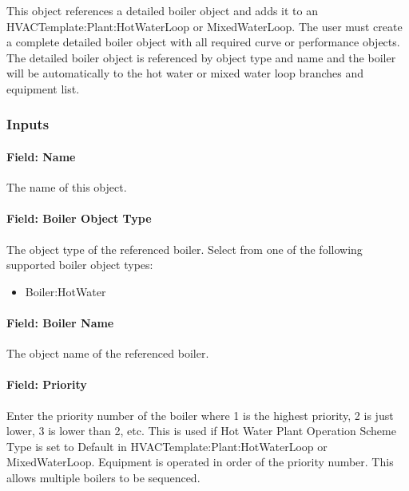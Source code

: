 This object references a detailed boiler object and adds it to an HVACTemplate:Plant:HotWaterLoop or MixedWaterLoop. The user must create a complete detailed boiler object with all required curve or performance objects. The detailed boiler object is referenced by object type and name and the boiler will be automatically to the hot water or mixed water loop branches and equipment list.

\subsubsection{Inputs}\label{inputs-30-000}

\paragraph{Field: Name}\label{field-name-17-002}

The name of this object.

\paragraph{Field: Boiler Object Type}\label{field-boiler-object-type}

The object type of the referenced boiler. Select from one of the following supported boiler object types:

\begin{itemize}
\tightlist
\item
  Boiler:HotWater
\end{itemize}

\paragraph{Field: Boiler Name}\label{field-boiler-name}

The object name of the referenced boiler.

\paragraph{Field: Priority}\label{field-priority-5}

Enter the priority number of the boiler where 1 is the highest priority, 2 is just lower, 3 is lower than 2, etc. This is used if Hot Water Plant Operation Scheme Type is set to Default in HVACTemplate:Plant:HotWaterLoop or MixedWaterLoop. Equipment is operated in order of the priority number. This allows multiple boilers to be sequenced.

